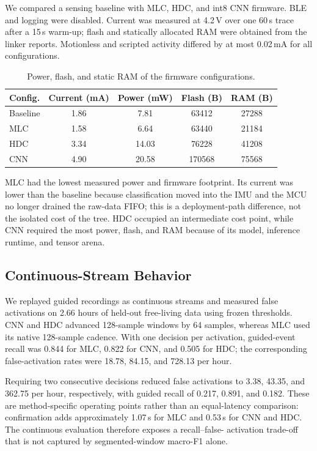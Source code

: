 We compared a sensing baseline with MLC, HDC, and int8 CNN firmware. BLE and
logging were disabled. Current was measured at 4.2\,V over one 60\,s trace
after a 15\,s warm-up; flash and statically allocated RAM were obtained from
the linker reports. Motionless and scripted activity differed by at most
0.02\,mA for all configurations.

\begin{table}[t]
    \centering
    \caption{Power, flash, and static RAM of the firmware configurations.}
    \label{tab:system_cost}
    \small
    \begin{tabular}{
        l
        S[table-format=1.2]
        S[table-format=2.2]
        S[table-format=6.0, group-separator={,}]
        S[table-format=5.0, group-separator={,}]
    }
        \toprule
        {Config.} & {Current (mA)} & {Power (mW)} & {Flash (B)} & {RAM (B)} \\
        \midrule
        Baseline & 1.86 &  7.81 &  63412 & 27288 \\
        MLC      & 1.58 &  6.64 &  63440 & 21184 \\
        HDC      & 3.34 & 14.03 &  76228 & 41208 \\
        CNN      & 4.90 & 20.58 & 170568 & 75568 \\
        \bottomrule
    \end{tabular}
\end{table}

MLC had the lowest measured power and firmware footprint. Its current was
lower than the baseline because classification moved into the IMU and the MCU
no longer drained the raw-data FIFO; this is a deployment-path difference, not
the isolated cost of the tree. HDC occupied an intermediate cost point, while
CNN required the most power, flash, and RAM because of its model, inference
runtime, and tensor arena.

\subsection{Continuous-Stream Behavior}

We replayed guided recordings as continuous streams and measured false
activations on 2.66 hours of held-out free-living data using frozen thresholds.
CNN and HDC advanced 128-sample windows by 64 samples, whereas MLC used its
native 128-sample cadence. With one decision per activation, guided-event
recall was 0.844 for MLC, 0.822 for CNN, and 0.505 for HDC; the corresponding
false-activation rates were 18.78, 84.15, and 728.13 per hour.

Requiring two consecutive decisions reduced false activations to 3.38, 43.35,
and 362.75 per hour, respectively, with guided recall of 0.217, 0.891, and
0.182. These are method-specific operating points rather than an equal-latency
comparison: confirmation adds approximately 1.07\,s for MLC and 0.53\,s for
CNN and HDC. The continuous evaluation therefore exposes a recall--false-
activation trade-off that is not captured by segmented-window macro-F1 alone.
